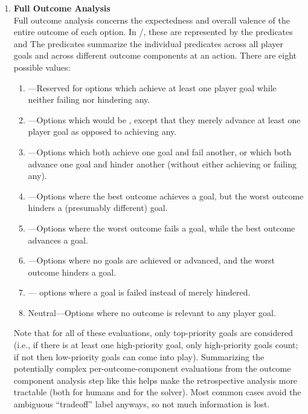 \begin{enumerate}
\item %
\textbf{Full Outcome Analysis} \\
%
Full outcome analysis concerns the expectedness and overall valence of the entire outcome of each option.
In \dunyazad/, these are represented by the predicates   and 
%
The  predicates summarize the individual  predicates across all player goals and across different outcome components at an action.
%
There are eight possible  values:
%
\begin{enumerate}
\item {}---Reserved for options which achieve at least one player goal while neither failing nor hindering any.
\item {}---Options which would be , except that they merely advance at least one player goal as opposed to achieving any.
\item {}---Options which both achieve one goal and fail another, or which both advance one goal and hinder another (without either achieving or failing any).
\item {}---Options where the best outcome achieves a goal, but the worst outcome hinders a (presumably different) goal.
\item {}---Options where the worst outcome fails a goal, while the best outcome advances a goal.
\item {}---Options where no goals are achieved or advanced, and the worst outcome hinders a goal.
\item {}--- options where a goal is failed instead of merely hindered.
\item Neutral---Options where no outcome is relevant to any player goal.
\end{enumerate}
%
Note that for all of these evaluations, only top-priority goals are considered (i.e., if there is at least one high-priority goal, only high-priority goals count; if not then low-priority goals can come into play).
%
Summarizing the potentially complex per-outcome-component evaluations from the outcome component analysis step like this helps make the retrospective analysis more tractable (both for humans and for the solver).
%
Most common cases avoid the ambiguous ``tradeoff'' label anyways, so not much information is lost.


\end{enumerate}

